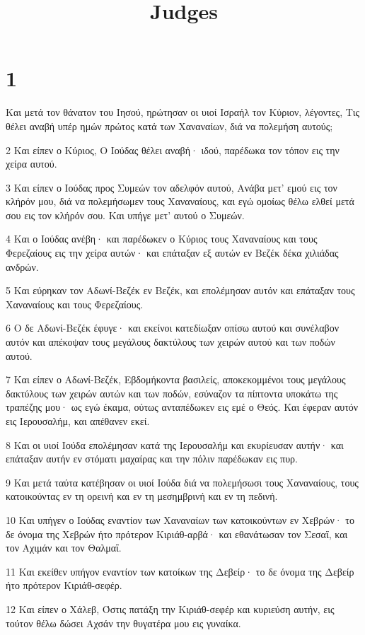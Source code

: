 

\title{Judges}


\chapter{1}

\par Και μετά τον θάνατον του Ιησού, ηρώτησαν οι υιοί Ισραήλ τον Κύριον, λέγοντες, Τις θέλει αναβή υπέρ ημών πρώτος κατά των Χαναναίων, διά να πολεμήση αυτούς;
\par 2 Και είπεν ο Κύριος, Ο Ιούδας θέλει αναβή· ιδού, παρέδωκα τον τόπον εις την χείρα αυτού.
\par 3 Και είπεν ο Ιούδας προς Συμεών τον αδελφόν αυτού, Ανάβα μετ' εμού εις τον κλήρόν μου, διά να πολεμήσωμεν τους Χαναναίους, και εγώ ομοίως θέλω ελθεί μετά σου εις τον κλήρόν σου. Και υπήγε μετ' αυτού ο Συμεών.
\par 4 Και ο Ιούδας ανέβη· και παρέδωκεν ο Κύριος τους Χαναναίους και τους Φερεζαίους εις την χείρα αυτών· και επάταξαν εξ αυτών εν Βεζέκ δέκα χιλιάδας ανδρών.
\par 5 Και εύρηκαν τον Αδωνί-Βεζέκ εν Βεζέκ, και επολέμησαν αυτόν και επάταξαν τους Χαναναίους και τους Φερεζαίους.
\par 6 Ο δε Αδωνί-Βεζέκ έφυγε· και εκείνοι κατεδίωξαν οπίσω αυτού και συνέλαβον αυτόν και απέκοψαν τους μεγάλους δακτύλους των χειρών αυτού και των ποδών αυτού.
\par 7 Και είπεν ο Αδωνί-Βεζέκ, Εβδομήκοντα βασιλείς, αποκεκομμένοι τους μεγάλους δακτύλους των χειρών αυτών και των ποδών, εσύναζον τα πίπτοντα υποκάτω της τραπέζης μου· ως εγώ έκαμα, ούτως ανταπέδωκεν εις εμέ ο Θεός. Και έφεραν αυτόν εις Ιερουσαλήμ, και απέθανεν εκεί.
\par 8 Και οι υιοί Ιούδα επολέμησαν κατά της Ιερουσαλήμ και εκυρίευσαν αυτήν· και επάταξαν αυτήν εν στόματι μαχαίρας και την πόλιν παρέδωκαν εις πυρ.
\par 9 Και μετά ταύτα κατέβησαν οι υιοί Ιούδα διά να πολεμήσωσι τους Χαναναίους, τους κατοικούντας εν τη ορεινή και εν τη μεσημβρινή και εν τη πεδινή.
\par 10 Και υπήγεν ο Ιούδας εναντίον των Χαναναίων των κατοικούντων εν Χεβρών· το δε όνομα της Χεβρών ήτο πρότερον Κιριάθ-αρβά· και εθανάτωσαν τον Σεσαΐ, και τον Αχιμάν και τον Θαλμαΐ.
\par 11 Και εκείθεν υπήγον εναντίον των κατοίκων της Δεβείρ· το δε όνομα της Δεβείρ ήτο πρότερον Κιριάθ-σεφέρ.
\par 12 Και είπεν ο Χάλεβ, Όστις πατάξη την Κιριάθ-σεφέρ και κυριεύση αυτήν, εις τούτον θέλω δώσει Αχσάν την θυγατέρα μου εις γυναίκα.
